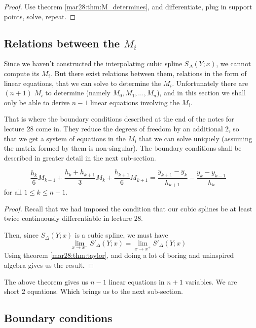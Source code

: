 \begin{proof}
  Use theorem \ref{mar28:thm:M_determines}, and differentiate, plug in support points, solve, repeat.
\end{proof}

\subsection{Relations between the $M_i$}

Since we haven't constructed the interpolating cubic spline $S_\Delta(Y ; x)$, we cannot compute its $M_i$. But there exist relations between them, relations in the form of linear equations, that we can solve to determine the $M_i$. Unfortunately there are $(n+1)$ $M_i$ to determine (namely $M_0, M_1, \dots , M_n$), and in this section we shall only be able to derive $n-1$ linear equations involving the $M_i$.

That is where the boundary conditions described at the end of the notes for lecture 28 come in. They reduce the degrees of freedom by an additional 2, so that we get a system of equations in the $M_i$ that we can solve uniquely (assuming the matrix formed by them is non-singular). The boundary conditions shall be described in greater detail in the next sub-section.

\begin{thm}
  \label{mar28:thm:cond_m}
  \[
    \frac{h_k}{6}M_{k-1} + \frac{h_k + h_{k+1}}{3}M_k + \frac{h_{k+1}}{6}M_{k+1}
    =
    \frac{y_{k+1} - y_k}{h_{k+1}} - \frac{y_k - y_{k-1}}{h_k}
  \]
  for all $1 \leq k \leq n-1$.
\end{thm}

\begin{proof}
  Recall that we had imposed the condition that our cubic splines be at least twice continuously differentiable in lecture 28.
  
  Then, since $S_\Delta(Y ; x)$ is a cubic spline, we must have
  \[
    \lim_{x\to x^-} S'_\Delta(Y ; x) = \lim_{x\to x^+} S'_\Delta(Y ; x)
  \]
  Using theorem \ref{mar28:thm:taylor}, and doing a lot of boring and uninspired algebra gives us the result.
  \hfill
\end{proof}

\begin{rmk}
  The above theorem gives us $n-1$ linear equations in $n+1$ variables. We are short 2 equations. Which brings us to the next sub-section.
\end{rmk}

\subsection{Boundary conditions}

